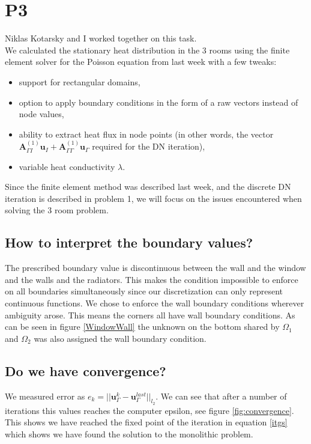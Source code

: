 \documentclass[12pt,a4paper]{report}
\begin{document}
\section*{P3}

Niklas Kotarsky and I worked together on this task.\\

We calculated the stationary heat distribution in the 3 rooms using the finite element solver for the Poisson equation from last week with a few tweaks:
\begin{itemize}
	\item support for rectangular domains,
	\item option to apply boundary conditions in the form of a raw vectors instead of node values,
	\item ability to extract heat flux in node points (in other words, the vector $\mathbf{A}^{(1)}_{\Gamma I}\mathbf{u}_I + \mathbf{A}^{(1)}_{\Gamma\Gamma}\mathbf{u}_\Gamma$ required for the DN iteration),
	\item variable heat conductivity $\lambda$.
\end{itemize}

    Since the finite element method was described last week, and the discrete DN iteration is described in problem 1, we will focus on the issues encountered when solving the 3 room problem.
    
    \subsection*{How to interpret the boundary values?}
    The prescribed boundary value is discontinuous between the wall and the window and the walls and the radiators. This makes the condition impossible to enforce on all boundaries simultaneously since our discretization can only represent continuous functions. We chose to enforce the wall boundary conditions wherever ambiguity arose. This means the corners all have wall boundary conditions. As can be seen in figure \ref{WindowWall} the unknown on the bottom shared by $\Omega_1$ and $\Omega_2$ was also assigned the wall boundary condition.
    
    \subsection*{Do we have convergence?}
    We measured error as $e_k = ||\mathbf{u}_\Gamma^{k} - \mathbf{u}_\Gamma^{last}||_{l_2}$. We can see that after a number of iterations this values reaches the computer epsilon, see figure \ref{fig:convergence}. This shows we have reached the fixed point of the iteration in equation \eqref{itgs} which shows we have found the solution to the monolithic problem.\\
 
\end{document}
